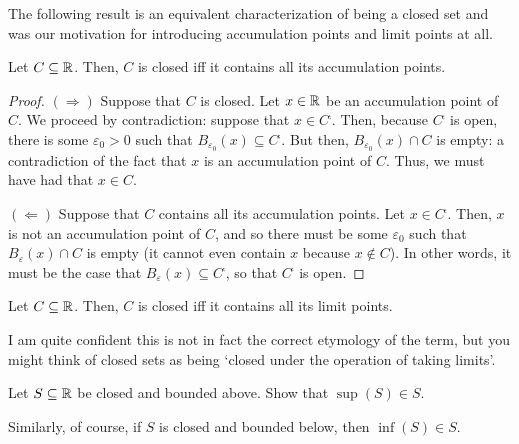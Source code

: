 The following result is an equivalent characterization of being a closed set and was our motivation for introducing accumulation points and limit points at all.
\begin{prp}\label{prp3.4.23}
Let $C\subseteq \mathbb{R}$.  Then, $C$ is closed iff it contains all its accumulation points.
\begin{proof}
$(\Rightarrow )$ Suppose that $C$ is closed.  Let $x\in \mathbb{R}$ be an accumulation point of $C$.  We proceed by contradiction:  suppose that $x\in C^{\comp}$.  Then, because $C^{\comp}$ is open, there is some $\varepsilon _0>0$ such that $B_{\varepsilon _0}(x)\subseteq C^{\comp}$.  But then, $B_{\varepsilon _0}(x)\cap C$ is empty:  a contradiction of the fact that $x$ is an accumulation point of $C$.  Thus, we must have had that $x\in C$.

\blankline
\noindent
$(\Leftarrow )$ Suppose that $C$ contains all its accumulation points.  Let $x\in C^{\comp}$.  Then, $x$ is not an accumulation point of $C$, and so there must be some $\varepsilon _0$ such that $B_{\varepsilon}(x)\cap C$ is empty (it cannot even contain $x$ because $x\notin C$).  In other words, it must be the case that $B_{\varepsilon}(x)\subseteq C^{\comp}$, so that $C^{\comp}$ is open.
\end{proof}
\end{prp}
\begin{crl}
Let $C\subseteq \mathbb{R}$.  Then, $C$ is closed iff it contains all its limit points.
\begin{rmk}
I am quite confident this is not in fact the correct etymology of the term, but you might think of closed sets as being `closed under the operation of taking limits'.
\end{rmk}
\end{crl}
\begin{exr}\label{exr3.4.27}
Let $S\subseteq \mathbb{R}$ be closed and bounded above.  Show that $\sup (S)\in S$.
\begin{rmk}
Similarly, of course, if $S$ is closed and bounded below, then $\inf (S)\in S$.
\end{rmk}
\end{exr}
